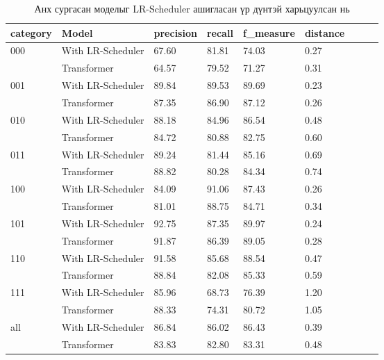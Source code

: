 \begin{table}[H] 
    \centering
    \caption{Анх сургасан моделыг LR-Scheduler ашигласан үр дүнтэй харьцуулсан нь}
    \label{Анх сургасан моделыг LR-Scheduler ашигласан үр дүнтэй харьцуулсан нь}
    \begin{tabular}
        {lllllllll} category  & Model             & precision & recall & f\_measure & distance \\ \hline
        \multirow{2}{*}{000} & With LR-Scheduler & 67.60 & 81.81 & 74.03 & 0.27  \\ & Transformer & 64.57 & 79.52 & 71.27 & 0.31 \\ \hline
        \multirow{2}{*}{001} & With LR-Scheduler & 89.84 & 89.53 & 89.69 & 0.23  \\ & Transformer & 87.35 & 86.90 & 87.12 & 0.26 \\ \hline
        \multirow{2}{*}{010} & With LR-Scheduler & 88.18 & 84.96 & 86.54 & 0.48  \\ & Transformer & 84.72 & 80.88 & 82.75 & 0.60 \\ \hline
        \multirow{2}{*}{011} & With LR-Scheduler & 89.24 & 81.44 & 85.16 & 0.69  \\ & Transformer & 88.82 & 80.28 & 84.34 & 0.74 \\ \hline
        \multirow{2}{*}{100} & With LR-Scheduler & 84.09 & 91.06 & 87.43 & 0.26  \\ & Transformer & 81.01 & 88.75 & 84.71 & 0.34 \\ \hline
        \multirow{2}{*}{101} & With LR-Scheduler & 92.75 & 87.35 & 89.97 & 0.24  \\ & Transformer & 91.87 & 86.39 & 89.05 & 0.28 \\ \hline
        \multirow{2}{*}{110} & With LR-Scheduler & 91.58 & 85.68 & 88.54 & 0.47  \\ & Transformer & 88.84 & 82.08 & 85.33 & 0.59 \\ \hline
        \multirow{2}{*}{111} & With LR-Scheduler & 85.96 & 68.73 & 76.39 & 1.20  \\ & Transformer & 88.33 & 74.31 & 80.72 & 1.05 \\ \hline
        \multirow{2}{*}{all} & With LR-Scheduler & 86.84 & 86.02 & 86.43 & 0.39  \\ & Transformer & 83.83 & 82.80 & 83.31 & 0.48 \\ \hline
    \end{tabular} 
\end{table}